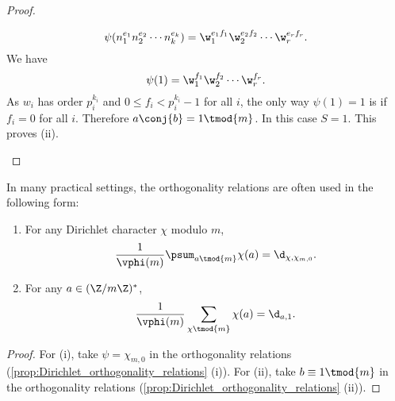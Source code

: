 \begin{proof}
\begin{enumerate}[label=(\roman*)]
        \[
          \psi(n_{1}^{e_{1}}n_{2}^{e_{2}} \cdots n_{k}^{e_{k}}) = \w_{1}^{e_{1}f_{1}}\w_{2}^{e_{2}f_{2}} \cdots \w_{r}^{e_{r}f_{r}}.
        \]
        We have
        \[
          \psi(1) = \w_{1}^{f_{1}}\w_{2}^{f_{2}} \cdots \w_{r}^{f_{r}}.
        \]
        As $w_{i}$ has order $p_{i}^{k_{i}}$ and $0 \le f_{i} < p_{i}^{k_{i}}-1$ for all $i$, the only way $\psi(1) = 1$ is if $f_{i} = 0$ for all $i$. Therefore $a\conj{b} = 1 \tmod{m}$. In this case $S = 1$. This proves (ii).
      \end{enumerate}
    \end{proof}

    In many practical settings, the orthogonality relations are often used in the following form:

    \begin{corollary}\label{cor:Dirichlet_orthogonality_relations}
    \phantom{ }
      \begin{enumerate}[label=(\roman*)]
        \item For any Dirichlet character $\chi$ modulo $m$,
        \[
          \frac{1}{\vphi(m)}\psum_{a \tmod{m}}\chi(a) = \d_{\chi,\chi_{m,0}}.
        \]
        \item For any $a \in (\Z/m\Z)^{\ast}$,
        \[
          \frac{1}{\vphi(m)}\sum_{\chi \tmod{m}}\chi(a) = \d_{a,1}.
        \]
      \end{enumerate}
    \end{corollary}
    \begin{proof}
      For (i), take $\psi = \chi_{m,0}$ in the orthogonality relations (\cref{prop:Dirichlet_orthogonality_relations} (i)). For (ii), take $b \equiv 1 \tmod{m}$ in the orthogonality relations (\cref{prop:Dirichlet_orthogonality_relations} (ii)).
    \end{proof}


